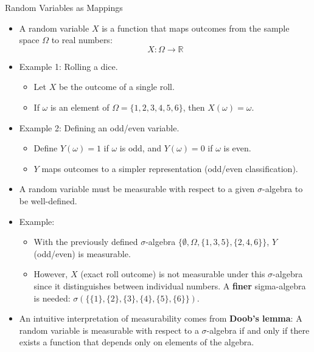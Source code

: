 \begin{frame}[allowframebreaks]{Random Variables as Mappings}
  \begin{itemize}
    \item A random variable $X$ is a function that maps outcomes from the sample space $\Omega$ to real numbers:
    \begin{equation}
      X: \Omega \to \mathbb{R}
    \end{equation}
    \item Example 1: Rolling a dice.
    \begin{itemize}
      \item Let $X$ be the outcome of a single roll.
      \item If $\omega$ is an element of $\Omega = \{1,2,3,4,5,6\}$, then $X(\omega) = \omega$.
    \end{itemize}
    \item Example 2: Defining an odd/even variable.
    \begin{itemize}
      \item Define $Y(\omega) = 1$ if $\omega$ is odd, and $Y(\omega) = 0$ if $\omega$ is even.
      \item $Y$ maps outcomes to a simpler representation (odd/even classification).
    \end{itemize}
    \framebreak
    \item A random variable must be measurable with respect to a given $\sigma$-algebra to be well-defined.
    \item Example:
    \begin{itemize}
      \item With the previously defined $\sigma$-algebra $\{\emptyset, \Omega, \{1,3,5\}, \{2,4,6\}\}$, $Y$ (odd/even) is measurable.
      \item However, $X$ (exact roll outcome) is not measurable under this $\sigma$-algebra since it distinguishes between individual numbers. A \textbf{finer} sigma-algebra is needed: $\sigma(\{\{1\},\{2\},\{3\},\{4\},\{5\},\{6\}\})$.
    \end{itemize}
    \item An intuitive interpretation of measurability comes from \textbf{Doob's lemma}: A random variable is measurable with respect to a $\sigma$-algebra if and only if there exists a function that depends only on elements of the algebra.
  \end{itemize}
\end{frame}

